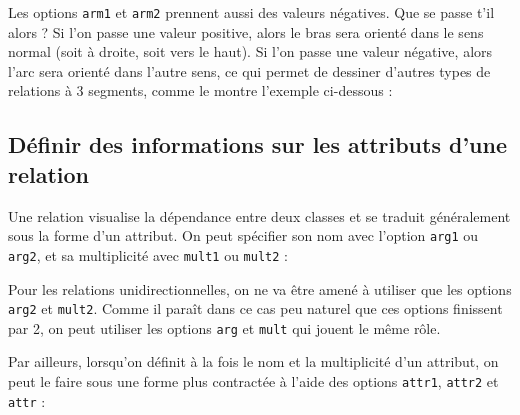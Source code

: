 \documentclass[a4paper,11pt]{report}
\newcommand{\inputTikZ}[1]{%
  }%
\newcommand{\inputTikZ}[1]{%
    \texttt{[image: fig/\#1.pdf]}%
  }%
\begin{document}
\medskip

Les options {\tt arm1} et {\tt arm2} prennent aussi des valeurs négatives. Que se passe t'il alors ?
Si l'on passe une valeur positive, alors le bras sera orienté dans le sens normal (soit à droite, soit vers le haut). Si l'on passe une valeur négative, alors l'arc sera orienté dans l'autre sens, ce qui permet de dessiner d'autres types de relations à 3 segments, comme le montre l'exemple ci-dessous :

\medskip

\begin{minipage}{0.5\textwidth}

\end{minipage}
\begin{minipage}{0.4\textwidth}
\begin{center}
\inputTikZ{relationarm2}
\end{center}
\end{minipage}


\subsection{Définir des informations sur les attributs d'une relation}\label{ss.relattr}

Une relation visualise la dépendance entre deux classes et se traduit généralement sous la forme d'un attribut. On peut spécifier son nom avec l'option {\tt arg1} ou {\tt arg2}, et sa multiplicité avec {\tt mult1} ou {\tt mult2} :

\medskip

\begin{minipage}{0.5\textwidth}

\end{minipage}
\begin{minipage}{0.4\textwidth}
\begin{center}
\inputTikZ{relationarg}
\end{center}
\end{minipage}

\medskip

Pour les relations unidirectionnelles, on ne va être amené à utiliser que les options {\tt arg2} et {\tt mult2}. Comme il paraît dans ce cas peu naturel que ces options finissent par 2, on peut utiliser les options {\tt arg} et {\tt mult} qui jouent le même rôle.

Par ailleurs, lorsqu'on définit à la fois le nom et la multiplicité d'un attribut, on peut le faire sous une forme plus contractée à l'aide des options {\tt attr1}, {\tt attr2} et {\tt attr} :
\end{document}
